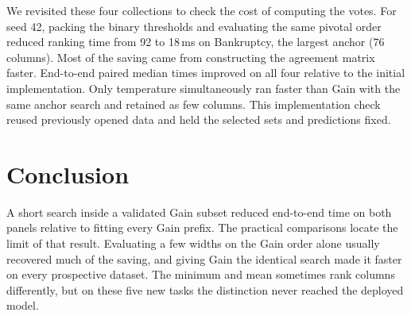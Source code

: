 We revisited these four collections to check the cost of computing the votes. For seed 42, packing the binary thresholds and evaluating the same pivotal order reduced ranking time from 92 to 18\,ms on Bankruptcy, the largest anchor (76 columns). Most of the saving came from constructing the agreement matrix faster. End-to-end paired median times improved on all four relative to the initial implementation. Only temperature simultaneously ran faster than Gain with the same anchor search and retained as few columns. This implementation check reused previously opened data and held the selected sets and predictions fixed.

\section{Conclusion}
A short search inside a validated Gain subset reduced end-to-end time on both panels relative to fitting every Gain prefix. The practical comparisons locate the limit of that result. Evaluating a few widths on the Gain order alone usually recovered much of the saving, and giving Gain the identical search made it faster on every prospective dataset. The minimum and mean sometimes rank columns differently, but on these five new tasks the distinction never reached the deployed model.
